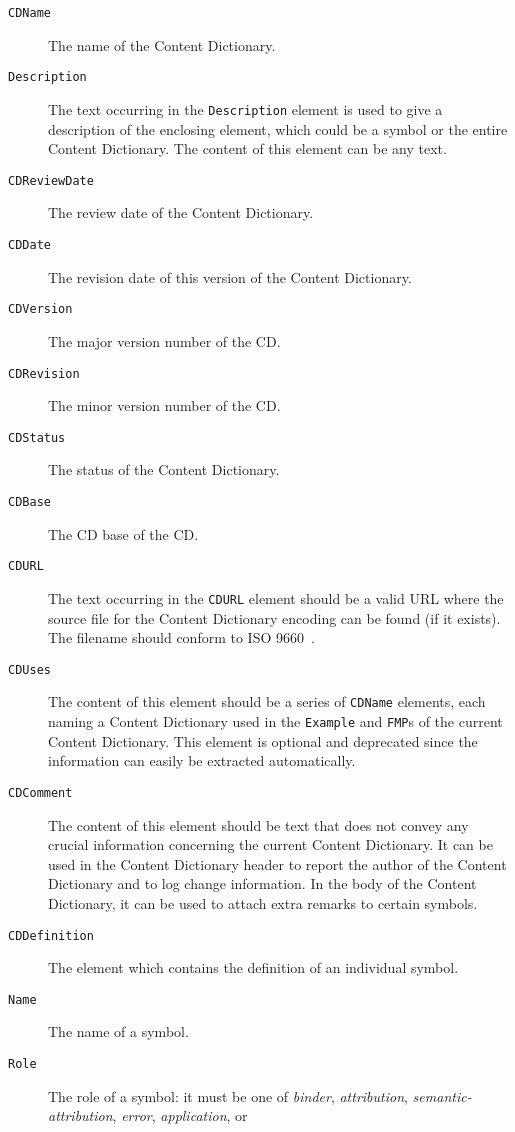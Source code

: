 \begin{description}
\item[\lstinline|CDName|] The name of the Content Dictionary.
\item[\lstinline|Description|] The text occurring in the \lstinline|Description| element
  is used to give a description of the enclosing element, which could be a symbol or the
  entire Content Dictionary. The content of this element can be any \XML text.
\item[\lstinline|CDReviewDate|] The review date of the Content Dictionary.
\item[\lstinline|CDDate|] The revision date of this version of the Content Dictionary.
\item[\lstinline|CDVersion|] The major version number of the CD.
\item[\lstinline|CDRevision|] The minor version number of the CD.
\item[\lstinline|CDStatus|] The status of the Content Dictionary.
\item[\lstinline|CDBase|] The CD base of the CD.
\item[\lstinline|CDURL|] The text occurring in the \lstinline|CDURL| element should be a
  valid URL where the source file for the Content Dictionary encoding can be found (if it
  exists). The filename should conform to ISO 9660~\cite{iso9660}.
\item[\lstinline|CDUses|] The content of this element should be a series of
  \lstinline|CDName| elements, each naming a Content Dictionary used in the
  \lstinline|Example| and \lstinline|FMP|s of the current Content Dictionary. This
  element is optional and deprecated since the information can easily be extracted
  automatically.
\item[\lstinline|CDComment|] The content of this element should be text that does not
  convey any crucial information concerning the current Content Dictionary. It can be used
  in the Content Dictionary header to report the author of the Content Dictionary and to
  log change information. In the body of the Content Dictionary, it can be used to attach
  extra remarks to certain symbols.
\item[\lstinline|CDDefinition|] The element which contains the definition of an
  individual symbol.
\item[\lstinline|Name|]The name of a symbol.
\item[\lstinline|Role|] The role of a symbol: it must be one of \emph{binder},
  \emph{attribution}, \emph{semantic-attribution}, \emph{error}, \emph{application}, or

\end{description}
